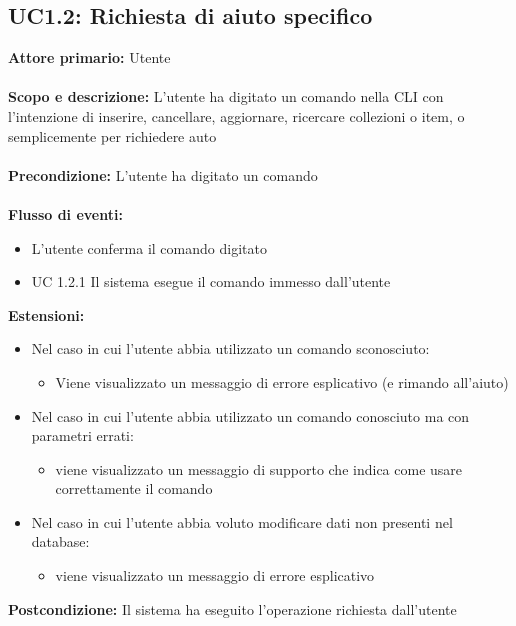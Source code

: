 \documentclass{scalatekids-article}
\begin{document}
\subsection{UC1.2: Richiesta di aiuto specifico}

\textbf{Attore primario:} Utente \\ \\
\textbf{Scopo e descrizione:}  L’utente ha digitato un comando nella CLI con l’intenzione di inserire, cancellare, aggiornare, ricercare collezioni o item, o semplicemente per richiedere auto\\ \\
\textbf{Precondizione:} L’utente ha digitato un comando\\ \\
\textbf{Flusso di eventi:}
\begin{itemize}
\item L’utente conferma il comando digitato
\item UC 1.2.1 Il sistema esegue il comando immesso dall’utente
\end{itemize}
\textbf{Estensioni:}
\begin{itemize}
\item Nel caso in cui l’utente abbia utilizzato un comando sconosciuto:
  \begin{itemize}
  \item Viene visualizzato un messaggio di errore esplicativo (e rimando all'aiuto)
  \end{itemize}
\item Nel caso in cui l’utente abbia utilizzato un comando conosciuto ma con parametri errati:
  \begin{itemize}
  \item viene visualizzato un messaggio di supporto che indica come usare correttamente il comando
  \end{itemize}
\item Nel caso in cui l’utente abbia voluto modificare dati non presenti nel database:
  \begin{itemize}
  \item viene visualizzato un messaggio di errore esplicativo
  \end{itemize}
\end{itemize}
\textbf{Postcondizione:} Il sistema ha eseguito l’operazione richiesta dall’utente
\end{document}
